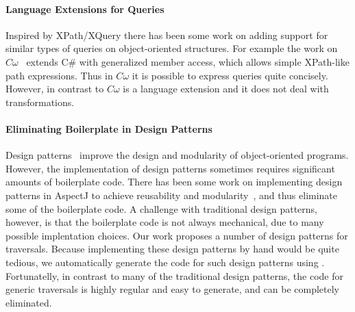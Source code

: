 \paragraph{Language Extensions for Queries}
Inspired by XPath/XQuery there has been some work on
adding support for similar types of queries on object-oriented
structures. For example the work on $C\omega$~\cite{BiermanMS05} extends
C\# with generalized member access, which allows simple
XPath-like path expressions. Thus in $C\omega$ it is possible
to express queries quite concisely. However, in contrast to \name
$C\omega$ is a language extension and it does not deal with transformations.

\paragraph{Eliminating Boilerplate in Design Patterns}
Design patterns~\cite{gof} improve the design and modularity of
object-oriented programs. However, the implementation of design
patterns sometimes requires significant amounts of boilerplate code. There has been
some work on implementing design patterns in AspectJ to achieve
reusability and modularity~\cite{Hannemann:2002:DPI:582419.582436},
and thus eliminate some of the boilerplate code. A challenge with
traditional design patterns, however, is that the boilerplate code is
not always mechanical, due to many possible implentation choices.
Our work proposes 
a number of design patterns for traversals. Because implementing these 
design patterns by hand would be quite tedious, we automatically
generate the code for such design patterns using \name. Fortunatelly, in contrast 
to many of the traditional design patterns, the code for 
generic traversals is highly regular and easy to generate, and can be
completely eliminated.  



